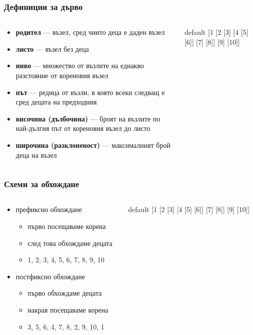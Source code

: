 \documentclass{beamer}
\newcommand{\sampletree}{%
  \begin{forest} default
    [1 [2 [3] [4 [5] [6]] [7] [8]] [9] [10]]
  \end{forest}%
}
\begin{document}
\begin{frame}
  \frametitle{Дефиниции за дърво}
  \begin{columns}
    \begin{column}{0.65\textwidth}
      \begin{itemize}
      \item \textbf{родител} --- възел, сред чиито деца е даден възел
      \item \textbf{листо} --- възел без деца
      \item \textbf{ниво} --- множество от възлите на еднакво разстояние от кореновия възел
      \item \textbf{път} --- редица от възли, в която всеки следващ е сред децата на предходния
      \item \textbf{височина (дълбочина)} --- броят на възлите по най-дългия път от кореновия възел до листо
      \item \textbf{широчина (разклоненост)} --- максималният брой деца на възел
      \end{itemize}
    \end{column}
    \begin{column}{0.35\textwidth}
      \sampletree
    \end{column}
  \end{columns}
\end{frame}

\begin{frame}
  \frametitle{Схеми за обхождане}
  \begin{columns}
    \begin{column}{0.65\textwidth}
      \begin{itemize}
      \item префиксно обхождане
        \begin{itemize}
        \item първо посещаваме корена
        \item след това обхождаме децата
          \pause
        \item 1, 2, 3, 4, 5, 6, 7, 8, 9, 10
        \end{itemize}
        \pause
      \item постфиксно обхождане
        \begin{itemize}
        \item първо обхождаме децата
        \item накрая посещаваме корена
          \pause
        \item 3, 5, 6, 4, 7, 8, 2, 9, 10, 1
        \end{itemize}
      \end{itemize}
    \end{column}
    \begin{column}{0.35\textwidth}
      \sampletree
    \end{column}
  \end{columns}
\end{frame}
\end{document}

